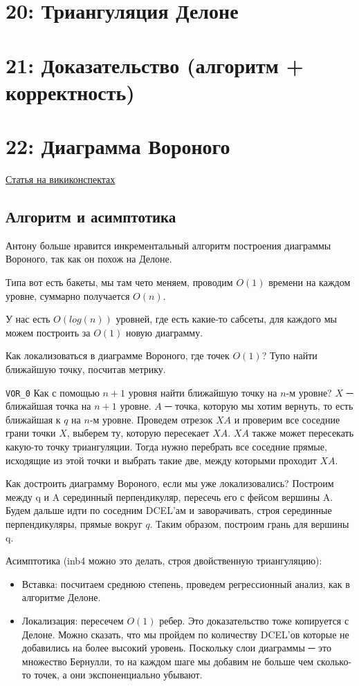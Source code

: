 \documentclass[11pt]{article}
\begin{document}
\section{{\bfseries{}} 20: Триангуляция Делоне}
\label{sec-22}
\section{{\bfseries{}} 21: Доказательство (алгоритм + корректность)}
\label{sec-23}
\section{{\bfseries{}} 22: Диаграмма Вороного}
\label{sec-24}
\href{http://neerc.ifmo.ru/wiki/index.php?title=Диаграмма_Вороного}{Статья на викиконспектах}
\subsection{Алгоритм и асимптотика}
\label{sec-24-1}
Антону больше нравится инкрементальный алгоритм построения диаграммы
Вороного, так как он похож на Делоне.

Типа вот есть бакеты, мы там чето меняем, проводим $O(1)$ времени на
каждом уровне, суммарно получается $O(n)$.

У нас есть $O(log(n))$ уровней, где есть какие-то сабсеты, для
каждого мы можем построить за $O(1)$ новую диаграмму.

Как локализоваться в диаграмме Вороного, где точек $O(1)$? Тупо
найти ближайшую точку, посчитав метрику.

\verb~VOR_0~
Как с помощью $n+1$ уровня найти ближайшую точку на $n$-м уровне?
$X$ ─ ближайшая точка на $n+1$ уровне. $A$ ─ точка, которую мы хотим
вернуть, то есть ближайшая к $q$ на $n$-м уровне. Проведем отрезок $XA$ и
проверим все соседние грани точки $X$, выберем ту, которую пересекает
$XA$. $XA$ также может пересекать какую-то точку триангуляции. Тогда
нужно перебрать все соседние прямые, исходящие из этой точки и
выбрать такие две, между которыми проходит $XA$.

Как достроить диаграмму Вороного, если мы уже локализовались?
Построим между q и A серединный перпендикуляр, пересечь его с фейсом
вершины A. Будем дальше идти по соседним DCEL'ам и заворачивать,
строя серединные перпендикуляры, прямые вокруг $q$. Таким образом,
построим грань для вершины q.

Асимптотика (inb4 можно это делать, строя двойственную триангуляцию):
\begin{itemize}
\item Вставка: посчитаем среднюю степень, проведем регрессионный анализ,
как в алгоритме Делоне.
\item Локализация: пересечем $O(1)$ ребер. Это доказательство тоже
копируется с Делоне. Можно сказать, что мы пройдем по количеству
DCEL'ов которые не добавились на более высокий уровень. Поскольку
слои диаграммы ─ это множество Бернулли, то на каждом шаге мы
добавим не больше чем сколько-то точек, а они экспоненциально
убывают.
\end{itemize}
\end{document}
